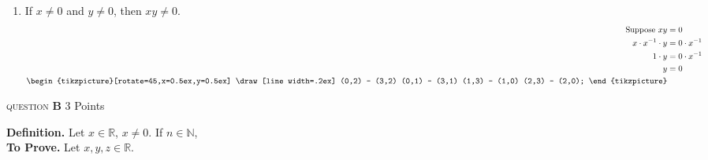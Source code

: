 \documentclass[11pt]{article}
\newcommand{\problem
}[2]{
\begin{mdframed}
    \textsc{question} \textbf{#1} \hfill #2
\end{mdframed}
}
\newcommand{\contradiction}{%
\begin{tikzpicture}[rotate=45,x=0.5ex,y=0.5ex]
\draw[line width=.2ex] (0,2) -- (3,2) (0,1) -- (3,1) (1,3) -- (1,0) (2,3) -- (2,0);
\end{tikzpicture}
}
\begin{document}
\begin{enumerate}
	\item If $x \neq 0$ and $y \neq 0$, then $x y \neq 0$.
	      \begin{align*}
		      \text{Suppose } x y    & = 0             \\
		      x \cdot x^{-1} \cdot y & = 0\cdot x^{-1} \\
		      1 \cdot y              & = 0\cdot x^{-1} \\
		      y                      & = 0
		      \\
		      \contradiction
	      \end{align*}

\end{enumerate}

\problem{B}{3 Points}
\textbf{Definition.} Let $x \in \mathbb{R}$, $x \neq 0.$ If $n \in \mathbb{N}$,
~\\
\noindent \textbf{To Prove.} Let $x, y, z \in \mathbb{R}$.
\end{document}
